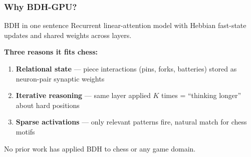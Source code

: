 \documentclass{beamer}
\begin{document}
\begin{frame}
\frametitle{Why BDH-GPU?}

\begin{block}{BDH in one sentence}
Recurrent linear-attention model with \alert{Hebbian fast-state updates} and \alert{shared weights across layers}.
\end{block}

\vspace{0.5em}
\textbf{Three reasons it fits chess:}

\begin{enumerate}
    \item \textbf{Relational state} --- piece interactions (pins, forks, batteries) stored as neuron-pair synaptic weights
    \item \textbf{Iterative reasoning} --- same layer applied $K$ times = ``thinking longer'' about hard positions
    \item \textbf{Sparse activations} --- only relevant patterns fire, natural match for chess motifs
\end{enumerate}

\vspace{0.5em}
\begin{center}
\alert{No prior work has applied BDH to chess or any game domain.}
\end{center}

\end{frame}
\end{document}
